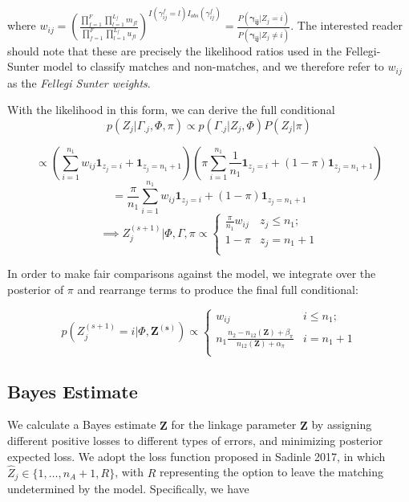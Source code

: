 \documentclass[12pt,letterpaper]{article}
\newcommand{\1}[1]{\mathbb{I}\!\left[#1\right]} %
\begin{document}
{where
$w_{ij} = \left(\frac{\prod_{f=1}^{F}\prod_{l=1}^{L_f} m_{fl}}{\prod_{f=1}^{F}\prod_{l=1}^{L_f} u_{fl}}\right)^{I(\gamma_{ij}^f = l)I_{obs}(\gamma_{ij}^f)} = \frac{P(\boldsymbol{\gamma_{ij}}|Z_j = i)}{P(\boldsymbol{\gamma_{ij}} |Z_j \neq i)}$.
The interested reader should note that these are precisely the
likelihood ratios used in the Fellegi-Sunter model to classify matches
and non-matches, and we therefore refer to \(w_{ij}\) as the
\emph{Fellegi Sunter weights}.

With the likelihood in this form, we can derive the full conditional
\[p(Z_j|\Gamma_{.j}, \Phi, \pi) \propto p(\Gamma_{.j}| Z_j, \Phi) P(Z_j|\pi)\]

\[\propto \left(\sum_{i=1}^{n_1}w_{ij}\mathbf{1}_{z_j = i} + \mathbf{1}_{z_j = n_1 + 1}\right)\left(\pi\sum_{i=1}^{n_1}\frac{1}{n_1}\mathbf{1}_{z_j = i} + (1-\pi)\mathbf{1}_{z_j = n_1 + 1}\right)\]
\[= \frac{\pi}{n_1}\sum_{i=1}^{n_1}w_{ij}\mathbf{1}_{z_j = i} + (1-\pi)\mathbf{1}_{z_j = n_1 + 1} \]
\[ \implies Z_j^{(s+1)} | \Phi, \Gamma, \pi \propto
\begin{cases} 
	\frac{\pi}{n_1}w_{ij}   & z_j \leq n_1; \\
	1-\pi &  z_j  = n_1 + 1 \\
\end{cases}\]

In order to make fair comparisons against the \citep{sadinle_bayesian_2017} model, we
integrate over the posterior of \(\pi\) and rearrange terms to
produce the final full conditional:

\[p\left(Z_j^{(s+1)}  = i| \Phi, \mathbf{Z^{(s)}}\right) \propto
\begin{cases} 
	w_{ij}  & i \leq n_1; \\
	n_1 \frac{n_2 - n_{12}(\mathbf{Z}) + \beta_{\pi}}{n_{12}(\mathbf{Z}) + \alpha_{\pi}} & i  = n_1 + 1 \\
\end{cases}\]

\hypertarget{bayes-estimate}{%
	\subsection{Bayes Estimate}
	\label{bayes-estimate}}

We calculate a Bayes estimate \(\hat{\mathbf{Z}}\) for the linkage
parameter \(\mathbf{Z}\) by assigning different positive losses to
different types of errors, and minimizing posterior expected loss. We
adopt the loss function proposed in Sadinle 2017, in which
\(\hat{Z}_j \in \{1, \ldots, n_A + 1, R\}\), with \(R\) representing the
option to leave the matching undetermined by the model. Specifically, we have

}
\end{document}
